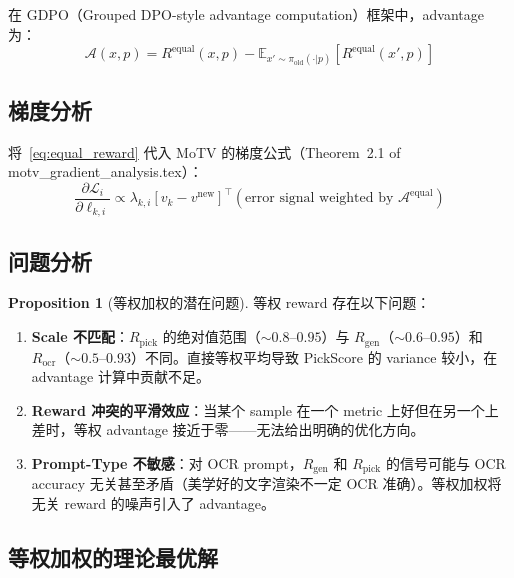 \documentclass[11pt,a4paper]{article}
\newcommand{\loss}{\mathcal{L}}
\newcommand{\E}{\mathbb{E}}
\newcommand{\adv}{\mathcal{A}}
\newcommand{\reward}{R}
\theoremstyle{definition}
\newtheorem{proposition}{Proposition}
\begin{document}
在 GDPO（Grouped DPO-style advantage computation）框架中，advantage 为：
\begin{equation}
\adv(x, p) = \reward^{\mathrm{equal}}(x, p) - \E_{x' \sim \pi_{\mathrm{old}}(\cdot|p)}\left[\reward^{\mathrm{equal}}(x', p)\right]
\end{equation}

\subsection{梯度分析}

将~\eqref{eq:equal_reward} 代入 MoTV 的梯度公式（Theorem~2.1 of motv\_gradient\_analysis.tex）：
\begin{equation}
\frac{\partial \loss_i}{\partial \ell_{k,i}} \propto \lambda_{k,i}\left[v_k - v^{\mathrm{new}}\right]^\top \left(\text{error signal weighted by } \adv^{\mathrm{equal}}\right)
\end{equation}

\subsection{问题分析}

\begin{proposition}[等权加权的潜在问题]
\label{prop:equal_weight_issues}
等权 reward 存在以下问题：

\begin{enumerate}[leftmargin=1.5em]
\item \textbf{Scale 不匹配}：$R_{\mathrm{pick}}$ 的绝对值范围（$\sim 0.8$--$0.95$）与 $R_{\mathrm{gen}}$（$\sim 0.6$--$0.95$）和 $R_{\mathrm{ocr}}$（$\sim 0.5$--$0.93$）不同。直接等权平均导致 PickScore 的 variance 较小，在 advantage 计算中贡献不足。

\item \textbf{Reward 冲突的平滑效应}：当某个 sample 在一个 metric 上好但在另一个上差时，等权 advantage 接近于零——无法给出明确的优化方向。

\item \textbf{Prompt-Type 不敏感}：对 OCR prompt，$R_{\mathrm{gen}}$ 和 $R_{\mathrm{pick}}$ 的信号可能与 OCR accuracy 无关甚至矛盾（美学好的文字渲染不一定 OCR 准确）。等权加权将无关 reward 的噪声引入了 advantage。
\end{enumerate}
\end{proposition}

\subsection{等权加权的理论最优解}
\end{document}
